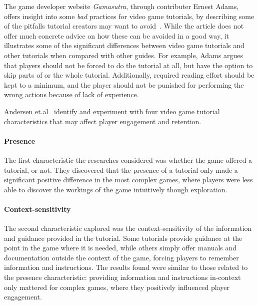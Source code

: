 \noindent
The game developer website \emph{Gamasutra}, through contributer Ernest Adams, offers insight into some \emph{bad} practices for video game tutorials, by describing some of the pitfalls tutorial creators may want to avoid~\cite{adams:bad_tutorial}. While the article does not offer much concrete advice on how these can be avoided in a good way, it illustrates some of the significant differences between video game tutorials and other tutorials when compared with other guides. For example, Adams argues that players should not be forced to do the tutorial at all, but have the option to skip parts of or the whole tutorial. Additionally, required reading effort should be kept to a minimum, and the player should not be punished for performing the wrong actions because of lack of experience.

\noindent
Andersen et.al~\cite{andersen:tutorials_impact} identify and experiment with four video game tutorial characteristics that may affect player engagement and retention.

\paragraph{Presence} The first characteristic the researches considered was whether the game offered a tutorial, or not. They discovered that the presence of a tutorial only made a significant positive difference in the most complex games, where players were less able to discover the workings of the game intuitively though exploration.

\paragraph{Context-sensitivity} The second characteristic explored was the context-sensitivity of the information and guidance provided in the tutorial. Some tutorials provide guidance at the point in the game where it is needed, while others simply offer manuals and documentation outside the context of the game, forcing players to remember information and instructions. The results found were similar to those related to the presence characteristic: providing information and instructions in-context only mattered for complex games, where they positively influenced player engagement.

